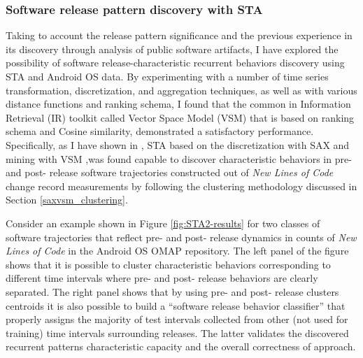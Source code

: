 \subsubsection{Software release pattern discovery with STA}
Taking to account the release pattern significance and the previous experience in its discovery through analysis of public software artifacts, I have explored the possibility of software release-characteristic recurrent behaviors discovery using STA and Android OS  data. By experimenting with a number of time series transformation, discretization, and aggregation techniques, as well as with  various distance functions and ranking schema, I found that the common in Information Retrieval (IR) toolkit called Vector Space Model  (VSM) \cite{citeulike:300428} that is based on \tfidf ranking schema and Cosine similarity, demonstrated a satisfactory performance.  Specifically, as I have shown in \cite{csdl2-11-10}, STA based on the discretization with SAX \cite{sax} and mining with VSM  \cite{citeulike:300428},was found capable to discover characteristic behaviors in pre- and post- release software trajectories  constructed out of \textit{New Lines of Code} change record measurements by following the clustering methodology discussed in Section \ref{saxvsm_clustering}. 

Consider an example shown in Figure \ref{fig:STA2-results} for two classes of software trajectories that reflect pre- and post- 
release dynamics in counts of \textit{New Lines of Code} in the Android OS OMAP repository. The left panel of the figure shows that it is possible to cluster characteristic behaviors corresponding to different time intervals where pre- and post- release behaviors are clearly separated. The right panel shows that by using pre- and post- release clusters centroids it is also possible to build a ``software release behavior classifier'' that properly assigns the majority of test intervals collected from other (not used for training) time intervals surrounding releases. The latter validates the discovered recurrent patterns characteristic capacity and the overall correctness of approach.

